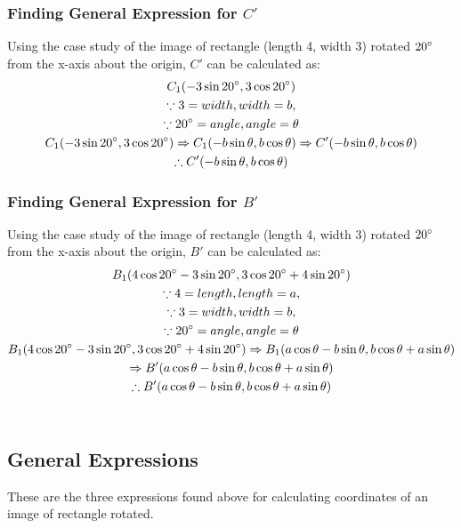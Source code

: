 \documentclass{article}
\begin{document}
        \subsubsection{Finding General Expression for $C'$} Using the case study of the image of rectangle (length 4, width 3) rotated $20\degree$ from the x-axis about the origin, $C'$ can be calculated as:
        \begin{gather*}
            C_1(-3\sin{20\degree}, 3\cos{20\degree}) \\
            \because 3 = width, width = b, \\
            \because 20\degree = angle, angle = \theta \\
            C_1(-3\sin{20\degree}, 3\cos{20\degree}) \Rightarrow C_1(-b\sin{\theta}, b\cos{\theta}) \Rightarrow C'(-b\sin{\theta}, b\cos{\theta}) \\
            \therefore C'(-b\sin{\theta}, b\cos{\theta})
        \end{gather*}
        \subsubsection{Finding General Expression for $B'$} Using the case study of the image of rectangle (length 4, width 3) rotated $20\degree$ from the x-axis about the origin, $B'$ can be calculated as:
        \begin{gather*}
            B_1(4\cos{20\degree} -3\sin{20\degree}, 3\cos{20\degree} + 4\sin{20\degree}) \\
            \because 4 = length, length = a, \\
            \because 3 = width, width = b, \\
            \because 20\degree = angle, angle = \theta \\
            B_1(4\cos{20\degree} -3\sin{20\degree}, 3\cos{20\degree} + 4\sin{20\degree}) \Rightarrow B_1(a\cos{\theta} -b\sin{\theta}, b\cos{\theta} + a\sin{\theta}) \\ \Rightarrow B'(a\cos{\theta} -b\sin{\theta}, b\cos{\theta} + a\sin{\theta}) \\
            \therefore B'(a\cos{\theta} -b\sin{\theta}, b\cos{\theta} + a\sin{\theta})
        \end{gather*} \\
        \subsection{General Expressions} These are the three expressions found above for calculating coordinates of an image of rectangle rotated.
\end{document}
